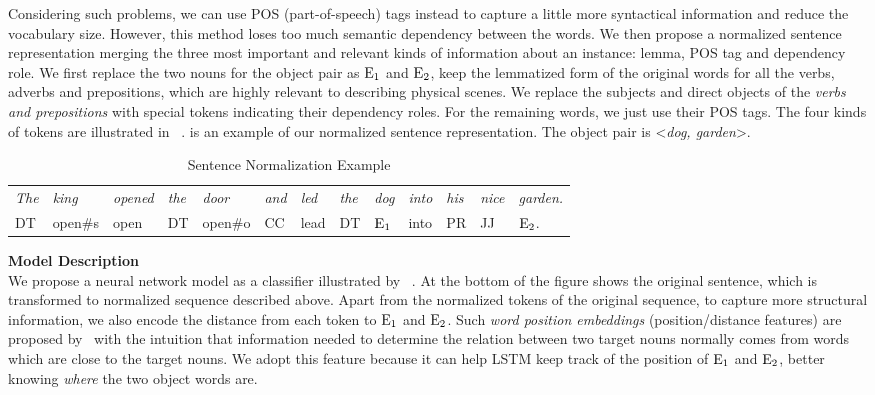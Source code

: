 Considering such problems, we can use POS (part-of-speech) tags instead to capture a little more syntactical information and reduce the vocabulary size. 
However, this method loses too much semantic dependency between the words. 
We then propose a normalized sentence representation merging the three most important and relevant kinds of information about an instance: lemma, POS tag and dependency role. 
We first replace the two nouns for the object pair as $\textnormal{E}_1$ and $\textnormal{E}_2$, keep the lemmatized form of the original words for all the verbs, adverbs and prepositions, which are highly relevant to describing physical scenes. 
We replace the subjects and direct objects of the \textit{verbs and prepositions} with special tokens indicating their dependency roles. 
For the remaining words, we just use their POS tags. 
The four kinds of tokens are illustrated in ~.
 is an example of our normalized sentence representation. The object pair is \textless \textit{dog, garden}\textgreater.

\begin{table*}[!th]
\centering
\begin{tabular}{lllllllllllll}
		\hline
\textit{The }&\textit{king }&\textit{opened }&\textit{the}&\textit{door}&\textit{and}& \textit{led}& \textit{the}& \textit{dog }& \textit{into }& \textit{his }& \textit{nice }& \textit{garden.}\\		 
DT & open\#s & open & DT & open\#o & CC& lead& DT &$\textnormal{E}_1$ & into & PR & JJ& $\textnormal{E}_2$.\\	 \hline
\end{tabular}
\caption{Sentence Normalization Example}
\label{tab:norm_eg}
\end{table*}

\noindent \textbf{Model Description}
\\
We propose a neural network model as a classifier illustrated by ~.
At the bottom of the figure shows the original sentence, which is transformed to normalized sequence described above.
Apart from the normalized tokens of the original sequence, to capture more structural information, we also encode the distance from each token to $\textnormal E_1$ and $\textnormal E_2$.
Such \textit{word position embeddings} (position/distance features) are proposed by~\citeauthor{zeng2014relation} with the intuition that information needed to determine the relation between two target nouns normally comes from words which are close to the target nouns. We adopt this feature because it can help LSTM keep track of the position of $\textnormal E_1$ and $\textnormal E_2$, better knowing \textit{where} the two object words are.

